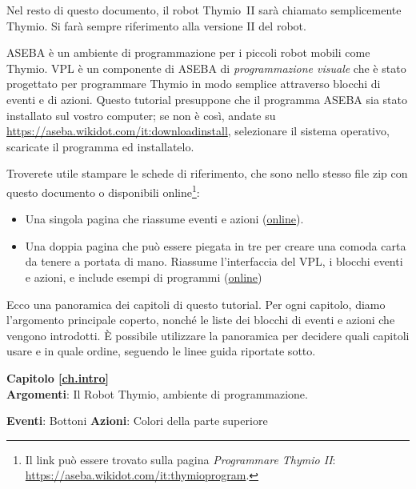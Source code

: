 Nel resto di questo documento, il robot Thymio~II sarà chiamato semplicemente Thymio.
Si farà sempre riferimento alla versione II del robot.

ASEBA è un ambiente di programmazione per i piccoli robot mobili come Thymio.
VPL è un componente di ASEBA di \textit{programmazione visuale} che è stato progettato per programmare Thymio in modo semplice attraverso blocchi di eventi e di azioni.
Questo tutorial presuppone che il programma ASEBA sia stato installato sul vostro computer; se non è così, andate su \url{https://aseba.wikidot.com/it:downloadinstall}, selezionare il sistema operativo, scaricate il programma ed installatelo.

Troverete utile stampare le schede di riferimento, che sono nello stesso file zip con questo documento o disponibili online\footnote{Il link può essere trovato sulla pagina \textit{Programmare Thymio II}: \\
\url{https://aseba.wikidot.com/it:thymioprogram}.}:
\begin{itemize}
\item Una singola pagina che riassume eventi e azioni (\href{https://aseba.wdfiles.com/local--files/it:thymioprogram/thymio-vpl-ref-card-it.pdf}{online}).
\item Una doppia pagina che può essere piegata in tre per creare una comoda carta da tenere a portata di mano.
Riassume l'interfaccia del VPL, i blocchi eventi e azioni, e include esempi di programmi (\href{https://aseba.wdfiles.com/local--files/it:thymioprogram/thymio-vpl-folding-ref-card-it.pdf}{online})\\
\end{itemize}


Ecco una panoramica dei capitoli di questo tutorial.
Per ogni capitolo, diamo l'argomento principale coperto, nonché le liste
dei blocchi di eventi e azioni che vengono introdotti.
È possibile utilizzare la panoramica per decidere quali capitoli usare
e in quale ordine, seguendo le linee guida riportate sotto.

{\centering \textbf{Capitolo \ref{ch.intro}}\\}
\textbf{Argomenti}: Il Robot Thymio, ambiente di programmazione.

\textbf{Eventi}: Bottoni \hfill \textbf{Azioni}: Colori della parte superiore

 \hfill {}


